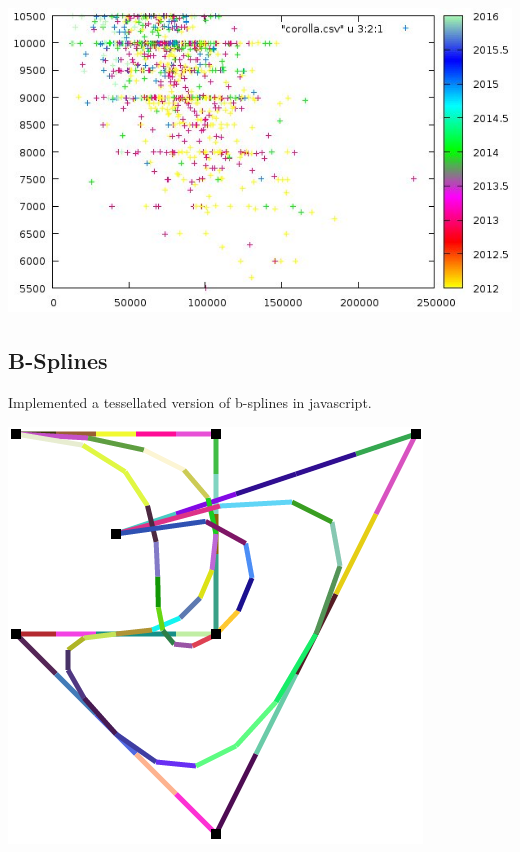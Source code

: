 \documentclass[../r.tex]{subfiles}
\begin{document}
\href{https://twitter.com/randompast/status/986749286208634881}{\includegraphics[scale=0.5]{../fun/cars.jpeg}}


\subsection{B-Splines}
Implemented a tessellated version of b-splines in javascript.

\href{https://github.com/randompast/b-spline}{\includegraphics[scale=0.5]{../fun/bspline.png} }
\end{document}
